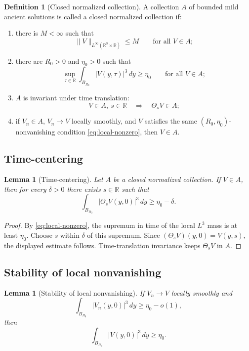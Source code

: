 \documentclass[11pt]{amsart}
\theoremstyle{plain}
\newtheorem{lemma}[theorem]{Lemma}
\theoremstyle{definition}
\newtheorem{definition}[theorem]{Definition}
\theoremstyle{remark}
\numberwithin{equation}{section}
\newcommand{\R}{\mathbb R}
\begin{document}
\begin{definition}[Closed normalized collection]\label{def:closed-normalized}
A collection \(A\) of bounded mild ancient solutions is called a closed
normalized collection if:
\begin{enumerate}[label=\textup{(\roman*)}]
\item there is \(M<\infty\) such that
\[
   \|V\|_{L^\infty(\R^3\times\R)}\le M
   \qquad\text{for all }V\in A;
\]
\item there are \(R_0>0\) and \(\eta_0>0\) such that
\begin{equation}\label{eq:local-nonzero}
   \sup_{\tau\in\R}
   \int_{B_{R_0}}|V(y,\tau)|^3\,dy
   \ge \eta_0
   \qquad\text{for all }V\in A;
\end{equation}
\item \(A\) is invariant under time translation:
\[
   V\in A,\ s\in\R
   \quad\Longrightarrow\quad
   \Theta_sV\in A;
\]
\item if \(V_n\in A\), \(V_n\to V\) locally smoothly, and \(V\) satisfies the
same \((R_0,\eta_0)\)-nonvanishing condition \eqref{eq:local-nonzero}, then
\(V\in A\).
\end{enumerate}
\end{definition}

\subsection{Time-centering}

\begin{lemma}[Time-centering]\label{lem:time-centering}
Let \(A\) be a closed normalized collection.  If \(V\in A\), then for every
\(\delta>0\) there exists \(s\in\R\) such that
\[
   \int_{B_{R_0}}|\Theta_sV(y,0)|^3\,dy
   \ge \eta_0-\delta.
\]
\end{lemma}

\begin{proof}
By \eqref{eq:local-nonzero}, the supremum in time of the local \(L^3\) mass is
at least \(\eta_0\).  Choose \(s\) within \(\delta\) of this supremum.  Since
\((\Theta_sV)(y,0)=V(y,s)\), the displayed estimate follows.  Time-translation
invariance keeps \(\Theta_sV\) in \(A\).
\end{proof}

\subsection{Stability of local nonvanishing}

\begin{lemma}[Stability of local nonvanishing]\label{lem:nonzero-stability}
If \(V_n\to V\) locally smoothly and
\[
   \int_{B_{R_0}}|V_n(y,0)|^3\,dy\ge \eta_0-o(1),
\]
then
\[
   \int_{B_{R_0}}|V(y,0)|^3\,dy\ge \eta_0 .
\]
\end{lemma}
\end{document}
